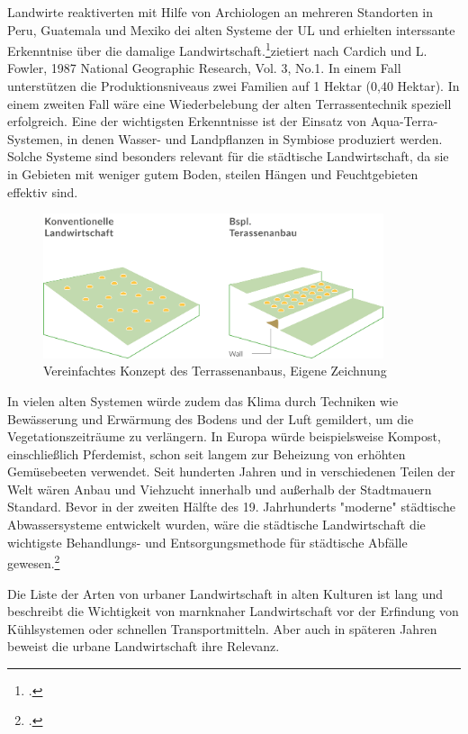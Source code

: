 \documentclass{scrartcl}
\begin{document}
Landwirte reaktiverten mit Hilfe von Archiologen an mehreren Standorten in Peru, Guatemala und Mexiko dei alten Systeme der UL und erhielten interssante Erkenntnise über die damalige Landwirtschaft.\footcite[Vgl.][S. 6]{Smit2001UrbanCities}{zietiert nach Cardich und L. Fowler, 1987 National Geographic Research, Vol. 3, No.1.}
In einem Fall unterstützen die Produktionsniveaus zwei Familien auf 1 Hektar (0,40 Hektar). In einem zweiten Fall wäre eine Wiederbelebung der alten Terrassentechnik speziell erfolgreich. Eine der wichtigsten Erkenntnisse ist der Einsatz von Aqua-Terra-Systemen, in denen Wasser- und Landpflanzen in Symbiose produziert werden. Solche Systeme sind besonders relevant für die städtische Landwirtschaft, da sie in Gebieten mit weniger gutem Boden, steilen Hängen und Feuchtgebieten effektiv sind. 

\begin{figure}[htbp]
\centering
\includegraphics[width=10cm]{image_folder/SchaubildTerassenanbau.png}
\caption{Vereinfachtes Konzept des Terrassenanbaus, Eigene Zeichnung}
\label{fig:Terassenlandwirtschaft}
\end{figure}

In vielen alten Systemen würde zudem das Klima durch Techniken wie Bewässerung und Erwärmung des Bodens und der Luft gemildert, um die Vegetationszeiträume zu verlängern. In Europa würde beispielsweise Kompost, einschließlich Pferdemist, schon seit langem zur Beheizung von erhöhten Gemüsebeeten verwendet. Seit hunderten Jahren und in verschiedenen Teilen der Welt wären Anbau und Viehzucht innerhalb und außerhalb der Stadtmauern Standard. Bevor in der zweiten Hälfte des 19. Jahrhunderts "moderne" städtische Abwassersysteme entwickelt wurden, wäre die städtische Landwirtschaft die wichtigste Behandlungs- und Entsorgungsmethode für städtische Abfälle gewesen.\footcite[Vgl.][S. 6-7]{Smit2001UrbanCities}

Die Liste der Arten von urbaner Landwirtschaft in alten Kulturen ist lang und beschreibt die Wichtigkeit von marnknaher Landwirtschaft vor der Erfindung von Kühlsystemen oder schnellen Transportmitteln. Aber auch in späteren Jahren beweist die urbane Landwirtschaft ihre Relevanz.
\end{document}
